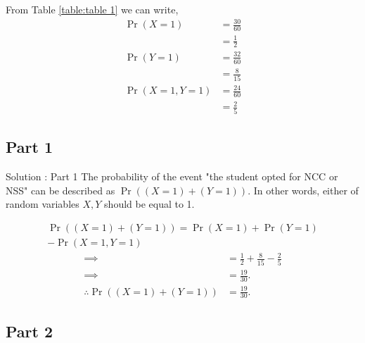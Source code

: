 \documentclass{beamer}
\providecommand{\pr}[1]{\ensuremath{\Pr\left(#1\right)}}
\providecommand{\brak}[1]{\ensuremath{\left(#1\right)}}
\begin{document}
        From Table \ref{table:table 1} we can write,
          \begin{align}
               \pr{X = 1} &= \frac{30}{60} \\
                               &=\frac{1}{2}\\
               \pr{Y = 1} &= \frac{32}{60} \\
                               &= \frac{8}{15}\label{eq:4}\\
               \pr{X = 1,Y=1} &= \frac{24}{60}\\
                                      &= \frac{2}{5}\label{eq:6}
          \end{align}
 \subsection{Part 1}
     
\begin{frame}{Solution : Part 1}
      The probability of the event "the student opted for NCC or NSS" can be described as $\pr{\brak{X = 1} + \brak{Y = 1}}$. In other words, either of random variables 
                $X,Y$ should be equal to 1.
                  
                   \begin{equation}
                   \begin{split}
                      \pr{\brak{X = 1} + \brak{Y = 1}} = \pr{X=1}+\pr{Y=1}\\
                                                                                    -\pr{X = 1,Y=1}
                    \end{split}
                   \end{equation}
                  \begin{align}
                        \implies      &= \frac{1}{2} + \frac{8}{15}  - \frac{2}{5}\\
                        \implies      &= \frac{19}{30}.\\
                    \therefore \pr{\brak{X = 1} + \brak{Y = 1}} &= \frac{19}{30}.\label{eq:10}
                    \end{align}
\end{frame} 
\subsection{Part 2}
\end{document}
